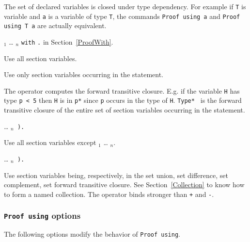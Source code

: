 The set of declared variables is closed under type dependency.
For example if {\tt T} is variable and {\tt a} is a variable of
type {\tt T}, the commands {\tt Proof using a} and
{\tt Proof using T a} are actually equivalent.

 {\ident$_1$} {\ldots} {\ident$_n$} {\tt with} {\tac}{\tt .} 
in Section~\ref{ProofWith}.


  Use all section variables.

  
  Use only section variables occurring in the statement.

  
  The {\tt *} operator computes the forward transitive closure.
  E.g. if the variable {\tt H} has type {\tt p < 5} then {\tt H} is
  in {\tt p*} since {\tt p} occurs in the type of {\tt H}.
  {\tt Type* } is the forward transitive closure of the entire set of
  section variables occurring in the statement.

 {\ldots} {\tt \ident$_n$  ).}
  
  Use all section variables except {\ident$_1$} {\ldots} {\ident$_n$}.



 {\ldots} {\tt \ident$_n$ ).}


  Use section variables being, respectively, in the set union, set difference,
  set complement, set forward transitive closure.
  See Section~\ref{Collection} to know how to form a named
  collection.
  The {\tt *} operator binds stronger than {\tt +} and {\tt -}.

\subsubsection{{\tt Proof using} options}

The following options modify the behavior of {\tt Proof using}.

